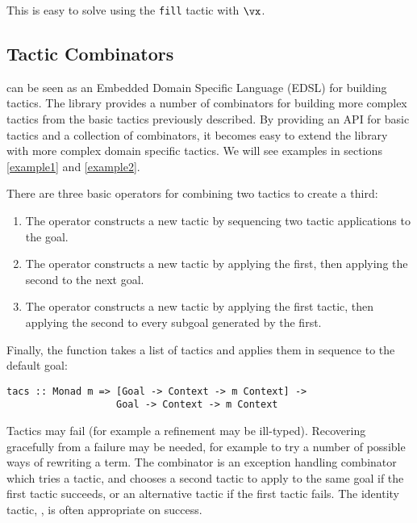 
This is easy to solve using the \texttt{fill} tactic with $\vx$.

\subsection{Tactic Combinators}

\label{combinators}

\Ivor{} can be seen as an Embedded Domain Specific Language (EDSL) for
building tactics. The library provides a number of
combinators for building more complex tactics from the basic tactics
previously described. By providing an API for basic tactics and a
collection of combinators, it becomes easy to extend the library with
more complex domain specific tactics. We will see examples in
sections \ref{example1} and \ref{example2}.

There are three basic operators for combining two tactics to create a third:


\begin{enumerate}
\item The \hdecl{>->} operator constructs a new tactic by sequencing two
tactic applications to the  goal.

\item The \hdecl{>+>} operator constructs a new tactic by applying the
  first, then applying the second to the next  goal.

\item The \hdecl{>=>} operator constructs a new tactic by applying the first
tactic, then applying the second to every subgoal generated by the first.

\end{enumerate}

Finally, the  function takes a list of tactics and applies
them in sequence to the default goal:

\verb+tacs :: Monad m => [Goal -> Context -> m Context] ->+\\
\verb+                   Goal -> Context -> m Context+

Tactics may fail (for example a refinement may be ill-typed). 
Recovering gracefully from a failure may be needed, for
example to try a number of possible ways of rewriting a term.
The  combinator is an exception handling combinator which
tries a tactic, and chooses a second tactic to apply to the same goal
if the first tactic succeeds, or an alternative tactic if the first
tactic fails.
The identity tactic, , is often appropriate on success.


